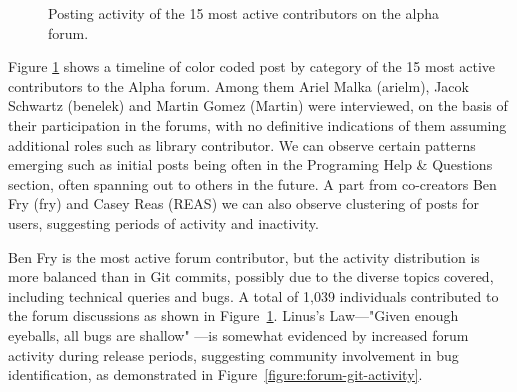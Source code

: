 \begin{figure}[h!]
	\centering
	\caption{Posting activity of the 15 most active contributors on the alpha forum.}
	\label{fig:processing-alpha-dot}
\end{figure}

\begin{multicols}{3}
	\noindent
  Figure \ref*{fig:processing-alpha-dot} shows a timeline of color coded post by category of the 15 most active contributors to the Alpha forum. Among them Ariel Malka (arielm), Jacok Schwartz (benelek) and Martin Gomez (Martin) were interviewed, on the basis of their participation in the forums, with no definitive indications of them assuming additional roles such as library contributor. We can observe certain patterns emerging such as initial posts being often in the Programing Help \& Questions section, often spanning out to others in the future. A part from co-creators Ben Fry (fry) and Casey Reas (REAS) we can also observe clustering of posts for users, suggesting periods of activity and inactivity. 
  \columnbreak

  \vfill\null
\end{multicols}


Ben Fry is the most active forum contributor, but the activity distribution is more balanced than in Git commits, possibly due to the diverse topics covered, including technical queries and bugs. A total of 1,039 individuals contributed to the forum discussions as shown in Figure~\ref{fig:processing-alpha-dot}.
Linus's Law—"Given enough eyeballs, all bugs are shallow" \parencite[29]{raymondCathedralBazaar1999}—is somewhat evidenced by increased forum activity during release periods, suggesting community involvement in bug identification, as demonstrated in Figure~\ref{figure:forum-git-activity}.

